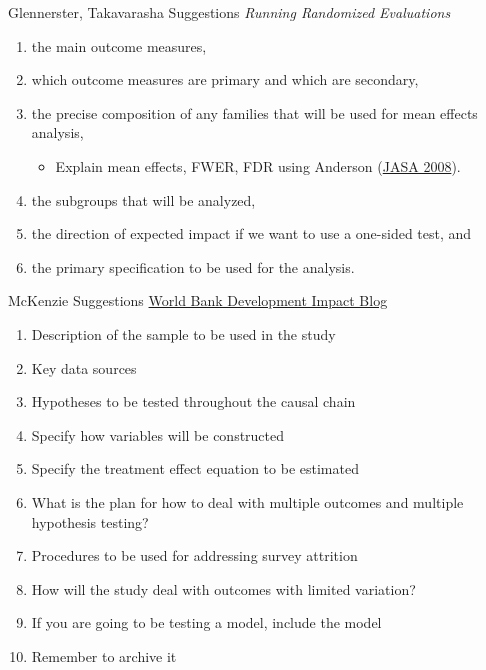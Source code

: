 \documentclass{beamer}
\begin{document}
\begin{frame}{Glennerster, Takavarasha Suggestions}
\textit{Running Randomized Evaluations}
\begin{enumerate}[<.->]
\def\labelenumi{\arabic{enumi}.}
\item
  the main outcome measures,
\item
  which outcome measures are primary and which are secondary,
\item
  the precise composition of any families that will be used for mean
  effects analysis,
  \begin{itemize}
  \item Explain mean effects, FWER, FDR using Anderson (\href{https://are.berkeley.edu/~mlanderson/pdf/Anderson\%202008a.pdf}{JASA 2008}).
  \end{itemize}
\item
  the subgroups that will be analyzed,
\item
  the direction of expected impact if we want to use a one-sided test,
  and
\item
  the primary specification to be used for the analysis.
\end{enumerate}
\end{frame}

\begin{frame}{McKenzie Suggestions}
\href{http://blogs.worldbank.org/impactevaluations/a-pre-analysis-plan-checklist}{World Bank Development Impact Blog}

\begin{enumerate}[<.->]
\item
  Description of the sample to be used in the study
\item
  Key data sources
\item
  Hypotheses to be tested throughout the causal chain
\item
  Specify how variables will be constructed
\item
  Specify the treatment effect equation to be estimated
\item
  What is the plan for how to deal with multiple outcomes and multiple
  hypothesis testing?
\item
  Procedures to be used for addressing survey attrition
\item
  How will the study deal with outcomes with limited variation?
\item
  If you are going to be testing a model, include the model
\item
  Remember to archive it
\end{enumerate}
\end{frame}
\end{document}
